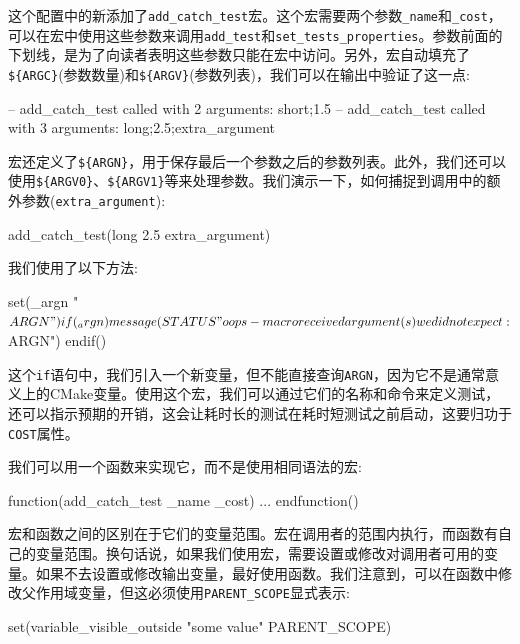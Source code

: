 
这个配置中的新添加了\texttt{add\_catch\_test}宏。这个宏需要两个参数\texttt{\_name}和\texttt{\_cost}，可以在宏中使用这些参数来调用\texttt{add\_test}和\texttt{set\_tests\_properties}。参数前面的下划线，是为了向读者表明这些参数只能在宏中访问。另外，宏自动填充了\texttt{\$\{ARGC\}}(参数数量)和\texttt{\$\{ARGV\}}(参数列表)，我们可以在输出中验证了这一点:

\begin{codebox}[shell]
-- add_catch_test called with 2 arguments: short;1.5
-- add_catch_test called with 3 arguments: long;2.5;extra_argument
\end{codebox}

宏还定义了\texttt{\$\{ARGN\}}，用于保存最后一个参数之后的参数列表。此外，我们还可以使用\texttt{\$\{ARGV0\}}、\texttt{\$\{ARGV1\}}等来处理参数。我们演示一下，如何捕捉到调用中的额外参数(\texttt{extra\_argument}):

\begin{codebox}[text]
add_catch_test(long 2.5 extra_argument)
\end{codebox}

我们使用了以下方法:

\begin{codebox}[cmake]
set(_argn "${ARGN}")
if(_argn)
    message(STATUS "oops - macro received argument(s) we did not expect: ${ARGN}")
endif()
\end{codebox}

这个\texttt{if}语句中，我们引入一个新变量，但不能直接查询\texttt{ARGN}，因为它不是通常意义上的CMake变量。使用这个宏，我们可以通过它们的名称和命令来定义测试，还可以指示预期的开销，这会让耗时长的测试在耗时短测试之前启动，这要归功于\texttt{COST}属性。

我们可以用一个函数来实现它，而不是使用相同语法的宏:

\begin{codebox}[cmake]
function(add_catch_test _name _cost)
    ...
endfunction()
\end{codebox}

宏和函数之间的区别在于它们的变量范围。宏在调用者的范围内执行，而函数有自己的变量范围。换句话说，如果我们使用宏，需要设置或修改对调用者可用的变量。如果不去设置或修改输出变量，最好使用函数。我们注意到，可以在函数中修改父作用域变量，但这必须使用\texttt{PARENT\_SCOPE}显式表示:

\begin{codebox}[cmake]
set(variable_visible_outside "some value" PARENT_SCOPE)
\end{codebox}

